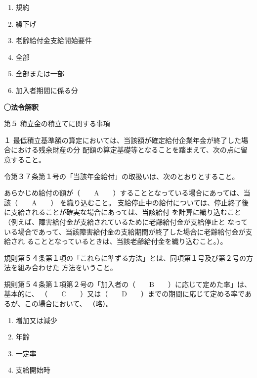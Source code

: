 \begin{answerbox}
  \begin{enumerate}[A: ]
    \item 規約
    \item 繰下げ
    \item 老齢給付金支給開始要件
    \item 全部
    \item 全部または一部
    \item 加入者期間に係る分
  \end{enumerate}
\end{answerbox}

\begin{fillblank}[数理人試験 2025 問題1 設問1 A〜D]
  \noindent \textbf{◯法令解釈}
  \begin{lawstructure}
    \begin{lawarticle}{}{}
      \noindent 第５ 積立金の積立てに関する事項

      １ 最低積立基準額の算定においては、当該額が確定給付企業年金が終了した場合における残余財産の分
        配額の算定基礎等となることを踏まえて、次の点に留意すること。
      
      令第３７条第１号の「当該年金給付」の取扱いは、次のとおりとすること。

      あらかじめ給付の額が（　　A　　）することとなっている場合にあっては、当該（　　A　　）
を織り込むこと。
    支給停止中の給付については、停止終了後に支給されることが確実な場合にあっては、当該給付
を計算に織り込むこと（例えば、障害給付金が支給されているために老齢給付金が支給停止と
なっている場合であって、当該障害給付金の支給期間が終了した場合に老齢給付金が支給され
ることとなっているときは、当該老齢給付金を織り込むこと。）。

規則第５４条第１項の「これらに準ずる方法」とは、同項第１号及び第２号の方法を組み合わせた
方法をいうこと。

規則第５４条第１項第２号の「加入者の（　　B　　）に応じて定めた率」は、 基本的に、
（　　C　　）又は（　　D　　）までの期間に応じて定める率であるが、この場合において、
（略）。

    \end{lawarticle}
  \end{lawstructure}
\end{fillblank}

\begin{answerbox}
  \begin{enumerate}[A: ]
    \item 増加又は減少
    \item 年齢
    \item 一定率
    \item 支給開始時
  \end{enumerate}
\end{answerbox}


